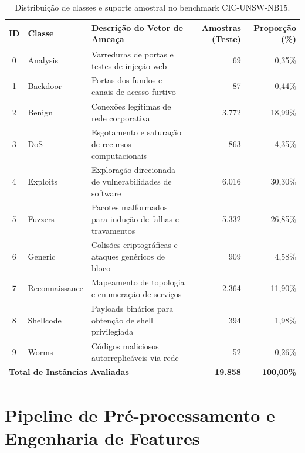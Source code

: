 \begin{table}[htb]
\centering
\caption{Distribuição de classes e suporte amostral no benchmark CIC-UNSW-NB15.}
\label{tab:distribuicao_unswnb15}
\small
\begin{tabularx}{\textwidth}{|c|l|X|r|r|}
\hline
\textbf{ID} & \textbf{Classe} & \textbf{Descrição do Vetor de Ameaça} & \textbf{Amostras (Teste)} & \textbf{Proporção (\%)} \\ \hline
0 & Analysis & Varreduras de portas e testes de injeção web & 69 & 0,35\% \\ \hline
1 & Backdoor & Portas dos fundos e canais de acesso furtivo & 87 & 0,44\% \\ \hline
2 & Benign & Conexões legítimas de rede corporativa & 3.772 & 18,99\% \\ \hline
3 & DoS & Esgotamento e saturação de recursos computacionais & 863 & 4,35\% \\ \hline
4 & Exploits & Exploração direcionada de vulnerabilidades de software & 6.016 & 30,30\% \\ \hline
5 & Fuzzers & Pacotes malformados para indução de falhas e travamentos & 5.332 & 26,85\% \\ \hline
6 & Generic & Colisões criptográficas e ataques genéricos de bloco & 909 & 4,58\% \\ \hline
7 & Reconnaissance & Mapeamento de topologia e enumeração de serviços & 2.364 & 11,90\% \\ \hline
8 & Shellcode & Payloads binários para obtenção de shell privilegiada & 394 & 1,98\% \\ \hline
9 & Worms & Códigos maliciosos autorreplicáveis via rede & 52 & 0,26\% \\ \hline
\multicolumn{3}{|l|}{\textbf{Total de Instâncias Avaliadas}} & \textbf{19.858} & \textbf{100,00\%} \\ \hline
\end{tabularx}
\end{table}



\section{Pipeline de Pré-processamento e Engenharia de Features}
\label{sec:preprocessamento}

